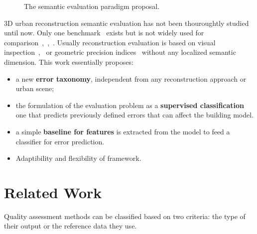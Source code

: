 \documentclass[runningheads]{llncs}
\begin{document}
    \begin{figure}
        \begin{center}
            
            \caption{\label{fig::pipeline} The semantic evaluation paradigm proposal. }
        \end{center}
    \end{figure}

     3D urban reconstruction semantic evaluation has not been thouroughtly studied until now. Only one benchmark~\cite{rottensteiner2014results} exists but is not widely used for comparison~\cite{Lafarge2012},~\cite{nguatem2017modeling},~\cite{li2016boxfitting}. Usually reconstruction evaluation is based on visual inspection~\cite{Durupt2006},~\cite{MacayMoreia2013} or geometric precision indices~\cite{Kaartinen2005} without any localized semantic dimension. This work essentially proposes:
    \begin{itemize}
        \item a new \textbf{error taxonomy}, independent from any reconstruction approach or urban scene;
        \item the formulation of the evaluation problem as a \textbf{supervised classification} one that predicts previously defined errors that can affect the building model.
        \item a simple \textbf{baseline for features} is extracted from the model to feed a classifier for error prediction.
        \item {\color{blue} Adaptibility and flexibility of framework}.
    \end{itemize}

\section{Related Work}

Quality assessment methods can be classified based on two criteria: the type of their output or the reference data they use.
\end{document}
